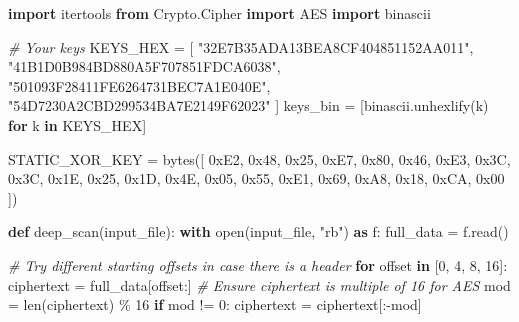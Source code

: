 \documentclass[
]{article}
\newenvironment{Shaded}{}{}
\newcommand{\BaseNTok}[1]{\textcolor[rgb]{0.25,0.63,0.44}{#1}}
\newcommand{\BuiltInTok}[1]{\textcolor[rgb]{0.00,0.50,0.00}{#1}}
\newcommand{\CommentTok}[1]{\textcolor[rgb]{0.38,0.63,0.69}{\textit{#1}}}
\newcommand{\ControlFlowTok}[1]{\textcolor[rgb]{0.00,0.44,0.13}{\textbf{#1}}}
\newcommand{\DecValTok}[1]{\textcolor[rgb]{0.25,0.63,0.44}{#1}}
\newcommand{\ImportTok}[1]{\textcolor[rgb]{0.00,0.50,0.00}{\textbf{#1}}}
\newcommand{\KeywordTok}[1]{\textcolor[rgb]{0.00,0.44,0.13}{\textbf{#1}}}
\newcommand{\NormalTok}[1]{#1}
\newcommand{\OperatorTok}[1]{\textcolor[rgb]{0.40,0.40,0.40}{#1}}
\newcommand{\StringTok}[1]{\textcolor[rgb]{0.25,0.44,0.63}{#1}}
\begin{document}
\begin{Shaded}
\begin{Highlighting}[]
\ImportTok{import}\NormalTok{ itertools}
\ImportTok{from}\NormalTok{ Crypto.Cipher }\ImportTok{import}\NormalTok{ AES}
\ImportTok{import}\NormalTok{ binascii}

\CommentTok{\# Your keys}
\NormalTok{KEYS\_HEX }\OperatorTok{=}\NormalTok{ [}
    \StringTok{"32E7B35ADA13BEA8CF404851152AA011"}\NormalTok{,}
    \StringTok{"41B1D0B984BD880A5F707851FDCA6038"}\NormalTok{,}
    \StringTok{"501093F28411FE6264731BEC7A1E040E"}\NormalTok{,}
    \StringTok{"54D7230A2CBD299534BA7E2149F62023"}
\NormalTok{]}
\NormalTok{keys\_bin }\OperatorTok{=}\NormalTok{ [binascii.unhexlify(k) }\ControlFlowTok{for}\NormalTok{ k }\KeywordTok{in}\NormalTok{ KEYS\_HEX]}

\NormalTok{STATIC\_XOR\_KEY }\OperatorTok{=} \BuiltInTok{bytes}\NormalTok{([}
    \BaseNTok{0xE2}\NormalTok{, }\BaseNTok{0x48}\NormalTok{, }\BaseNTok{0x25}\NormalTok{, }\BaseNTok{0xE7}\NormalTok{, }\BaseNTok{0x80}\NormalTok{, }\BaseNTok{0x46}\NormalTok{, }\BaseNTok{0xE3}\NormalTok{, }\BaseNTok{0x3C}\NormalTok{,}
    \BaseNTok{0x3C}\NormalTok{, }\BaseNTok{0x1E}\NormalTok{, }\BaseNTok{0x25}\NormalTok{, }\BaseNTok{0x1D}\NormalTok{, }\BaseNTok{0x4E}\NormalTok{, }\BaseNTok{0x05}\NormalTok{, }\BaseNTok{0x55}\NormalTok{, }\BaseNTok{0xE1}\NormalTok{,}
    \BaseNTok{0x69}\NormalTok{, }\BaseNTok{0xA8}\NormalTok{, }\BaseNTok{0x18}\NormalTok{, }\BaseNTok{0xCA}\NormalTok{, }\BaseNTok{0x00}
\NormalTok{])}

\KeywordTok{def}\NormalTok{ deep\_scan(input\_file):}
    \ControlFlowTok{with} \BuiltInTok{open}\NormalTok{(input\_file, }\StringTok{"rb"}\NormalTok{) }\ImportTok{as}\NormalTok{ f:}
\NormalTok{        full\_data }\OperatorTok{=}\NormalTok{ f.read()}

    \CommentTok{\# Try different starting offsets in case there is a header}
    \ControlFlowTok{for}\NormalTok{ offset }\KeywordTok{in}\NormalTok{ [}\DecValTok{0}\NormalTok{, }\DecValTok{4}\NormalTok{, }\DecValTok{8}\NormalTok{, }\DecValTok{16}\NormalTok{]:}
\NormalTok{        ciphertext }\OperatorTok{=}\NormalTok{ full\_data[offset:]}
        \CommentTok{\# Ensure ciphertext is multiple of 16 for AES}
\NormalTok{        mod }\OperatorTok{=} \BuiltInTok{len}\NormalTok{(ciphertext) }\OperatorTok{\%} \DecValTok{16}
        \ControlFlowTok{if}\NormalTok{ mod }\OperatorTok{!=} \DecValTok{0}\NormalTok{:}
\NormalTok{            ciphertext }\OperatorTok{=}\NormalTok{ ciphertext[:}\OperatorTok{{-}}\NormalTok{mod]}


\end{Highlighting}
\end{Shaded}
\end{document}
